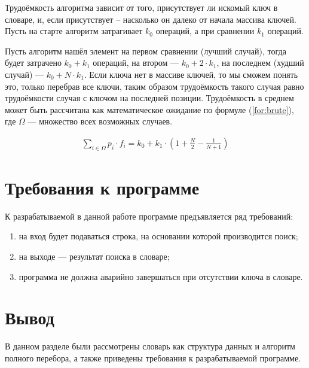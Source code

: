 Трудоёмкость алгоритма зависит от того, присутствует ли искомый ключ в словаре, и, если присутствует -- насколько он далеко от начала массива ключей.
Пусть на старте алгоритм затрагивает $k_{0}$ операций, а при сравнении $k_{1}$ операций.

Пусть алгоритм нашёл элемент на первом сравнении (лучший случай), тогда будет затрачено $k_0 + k_1$ операций, на втором --- $k_0 + 2 \cdot k_1$, на последнем (худший случай) --- $k_0 + N \cdot k_1$. Если ключа нет в массиве ключей, то мы сможем понять это, только перебрав все ключи, таким образом трудоёмкость такого случая равно трудоёмкости случая с ключом на последней позиции. Трудоёмкость в среднем может быть рассчитана как математическое ожидание по формуле (\ref{for:brute}), где $\Omega$ --- множество всех возможных случаев.

\begin{equation}
	\label{for:brute}
	\begin{aligned}
		\sum\limits_{i \in \Omega} p_i \cdot f_i = k_0 + k_1 \cdot \left(1 + \frac{N}{2} - \frac{1}{N + 1}\right)
	\end{aligned}
\end{equation}

\section{Требования к программе}

К разрабатываемой в данной работе программе предъявляется ряд требований:
\begin{enumerate}[label=\arabic*)]
	\item на вход будет подаваться строка, на основании которой производится поиск;
	\item на выходе --- результат поиска в словаре;
	\item программа не должна аварийно завершаться при отсутствии ключа в словаре.
\end{enumerate}

\section{Вывод}

В данном разделе были рассмотрены словарь как структура данных и алгоритм полного перебора, а также приведены требования к разрабатываемой программе.